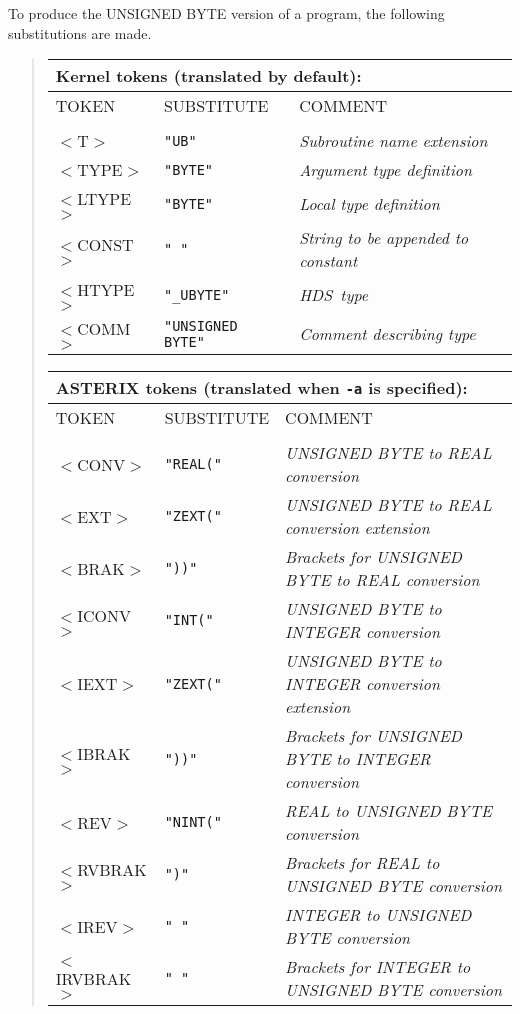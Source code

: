 \documentclass[twoside,11pt,nolof]{starlink}
\providecommand{\HDS}{{\footnotesize HDS}\normalsize}
\begin{document}
To produce the UNSIGNED BYTE version of a program, the following
substitutions are made.
\begin{quote}
\begin{tabular}{lll}
\multicolumn{3}{l}{\bf{Kernel} tokens (translated by default):} \\
\hline
TOKEN     &SUBSTITUTE     &COMMENT \\
\\
$<$T$>$       &\texttt{"UB"}     &\emph{Subroutine name extension} \\
$<$TYPE$>$    &\texttt{"BYTE"}   &\emph{Argument type definition} \\
$<$LTYPE$>$   &\texttt{"BYTE"}   &\emph{Local type definition} \\
$<$CONST$>$   &\texttt{" "}      &\emph{String to be appended to constant}\\
$<$HTYPE$>$   &\texttt{"\_UBYTE"}  &\emph{\HDS\ type} \\
$<$COMM$>$    &\texttt{"UNSIGNED BYTE"} &\emph{Comment describing type} \\
\end{tabular}

\begin{tabular}{lll}
\multicolumn{3}{l}{\bf{ASTERIX} tokens (translated when \texttt{-a} is specified):} \\
\hline
TOKEN     &SUBSTITUTE     &COMMENT \\
\\
$<$CONV$>$  &\texttt{"REAL("} &\emph{UNSIGNED BYTE to REAL conversion} \\
$<$EXT$>$   &\texttt{"ZEXT("} &\emph{UNSIGNED BYTE to REAL conversion extension}\\
$<$BRAK$>$  &\texttt{"))"} &\emph{Brackets for UNSIGNED BYTE to REAL conversion}\\
$<$ICONV$>$ &\texttt{"INT("}  &\emph{UNSIGNED BYTE to INTEGER conversion} \\
$<$IEXT$>$  &\texttt{"ZEXT("} &\emph{UNSIGNED BYTE to INTEGER conversion extension}\\
$<$IBRAK$>$   &\texttt{"))"}    &\emph{Brackets for UNSIGNED BYTE to INTEGER conversion}\\
$<$REV$>$     &\texttt{"NINT("} &\emph{REAL to UNSIGNED BYTE conversion} \\
$<$RVBRAK$>$  &\texttt{")"}     &\emph{Brackets for REAL to UNSIGNED BYTE conversion} \\
$<$IREV$>$    &\texttt{" "} &\emph{INTEGER to UNSIGNED BYTE conversion} \\
$<$IRVBRAK$>$ &\texttt{" "} &\emph{Brackets for INTEGER to UNSIGNED BYTE conversion}\\
\end{tabular}
\end{quote}
\end{document}
